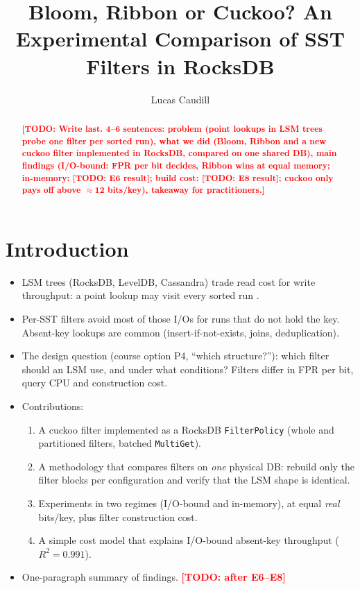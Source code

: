 \documentclass[sigconf,nonacm]{acmart}
\newcommand{\todo}[1]{\textcolor{red}{\textbf{[TODO: #1]}}}
\begin{document}
\title{Bloom, Ribbon or Cuckoo? An Experimental Comparison of SST Filters in RocksDB}

\author{Lucas Caudill}

\begin{abstract}
\todo{Write last. 4--6 sentences: problem (point lookups in LSM trees probe
one filter per sorted run), what we did (Bloom, Ribbon and a new cuckoo filter
implemented in RocksDB, compared on one shared DB), main findings (I/O-bound:
FPR per bit decides, Ribbon wins at equal memory; in-memory: \todo{E6
result}; build cost: \todo{E8 result}; cuckoo only pays off above
$\approx$12 bits/key), takeaway for practitioners.}
\end{abstract}

\maketitle


\section{Introduction}
\label{sec:intro}

\begin{itemize}
  \item LSM trees (RocksDB, LevelDB, Cassandra) trade read cost for write
    throughput: a point lookup may visit every sorted run
    \cite{oneil1996lsm,dong2021rocksdb}.
  \item Per-SST filters avoid most of those I/Os for runs that do not hold the
    key. Absent-key lookups are common (insert-if-not-exists, joins,
    deduplication).
  \item The design question (course option P4, ``which structure?''): which
    filter should an LSM use, and under what conditions? Filters differ in FPR
    per bit, query CPU and construction cost.
  \item Contributions:
    \begin{enumerate}
      \item A cuckoo filter \cite{fan2014cuckoo} implemented as a RocksDB
        \texttt{FilterPolicy} (whole and partitioned filters, batched
        \texttt{MultiGet}).
      \item A methodology that compares filters on \emph{one} physical DB:
        rebuild only the filter blocks per configuration and verify that the
        LSM shape is identical.
      \item Experiments in two regimes (I/O-bound and in-memory), at equal
        \emph{real} bits/key, plus filter construction cost.
      \item A simple cost model that explains I/O-bound absent-key throughput
        ($R^2 = 0.991$).
    \end{enumerate}
  \item One-paragraph summary of findings. \todo{after E6--E8}
\end{itemize}
\end{document}
